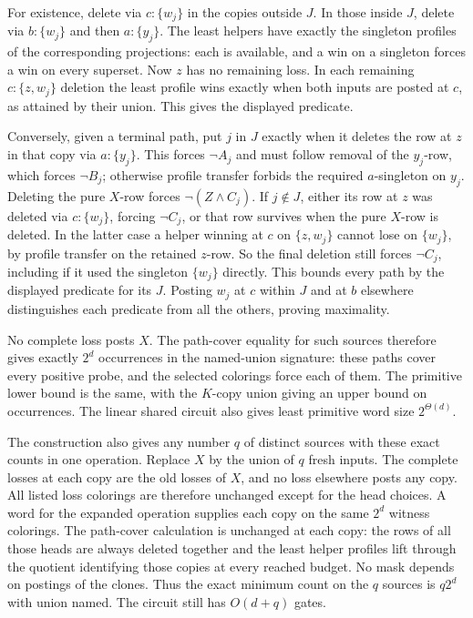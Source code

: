 For existence, delete via $c:\{w_j\}$ in the
copies outside $J$. In those inside $J$, delete
via $b:\{w_j\}$ and then $a:\{y_j\}$.
The least helpers have exactly the singleton
profiles of the corresponding projections:
each is available, and a win on a singleton
forces a win on every superset. Now $z$ has
no remaining loss. In each remaining
$c:\{z,w_j\}$ deletion the least profile wins
exactly when both inputs are posted at $c$,
as attained by their union. This gives the
displayed predicate.

Conversely, given a terminal path, put $j$ in
$J$ exactly when it deletes the row at $z$
in that copy via $a:\{y_j\}$. This forces
$\neg A_j$ and must follow removal of the
$y_j$-row, which forces $\neg B_j$; otherwise
profile transfer forbids the required
$a$-singleton on $y_j$. Deleting the pure
$X$-row forces $\neg(Z\land C_j)$.
If $j\notin J$, either its row at $z$ was
deleted via $c:\{w_j\}$, forcing $\neg C_j$,
or that row survives when the pure $X$-row
is deleted. In the latter case a helper
winning at $c$ on $\{z,w_j\}$ cannot lose on
$\{w_j\}$, by profile transfer on the retained
$z$-row. So the final deletion still forces
$\neg C_j$, including if it used the
singleton $\{w_j\}$ directly. This bounds
every path by the displayed predicate for its
$J$. Posting $w_j$ at $c$ within $J$ and at
$b$ elsewhere distinguishes each predicate
from all the others, proving maximality.

No complete loss posts $X$. The path-cover
equality for such sources therefore gives
exactly $2^d$ occurrences in the named-union
signature: these paths cover every positive
probe, and the selected colorings force each
of them. The primitive lower bound is the
same, with the $K$-copy union giving an upper
bound on occurrences. The linear shared
circuit also gives least primitive word size
$2^{\Theta(d)}$.

The construction also gives any number $q$ of
distinct sources with these exact counts in one
operation. Replace $X$ by the union of $q$ fresh
inputs. The complete losses at each copy are the
old losses of $X$, and no loss elsewhere posts
any copy. All listed loss colorings are therefore
unchanged except for the head choices. A word
for the expanded operation supplies each copy
on the same $2^d$ witness colorings. The
path-cover calculation is unchanged at each
copy: the rows of
all those heads are always deleted together
and the least helper profiles lift through
the quotient identifying those copies at every
reached budget. No mask depends on postings of the
clones. Thus the exact
minimum count on the $q$ sources is $q2^d$
with union named. The circuit still has
$O(d+q)$ gates.

